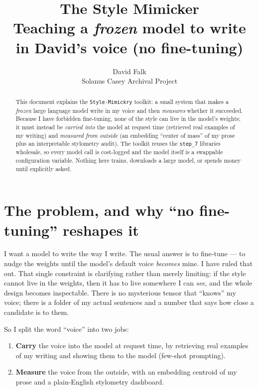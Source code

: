 \documentclass[11pt]{article}
\title{\bfseries The Style Mimicker\\[2pt]
\large Teaching a \emph{frozen} model to write in David's voice (no fine-tuning)}
\author{David Falk \\ Solanus Casey Archival Project}
\date{}
\newcommand{\code}[1]{\texttt{#1}}
\begin{document}
\maketitle

\begin{abstract}
This document explains the \code{Style-Mimickry} toolkit: a small system that makes a
\emph{frozen} large language model write in my voice and then \emph{measures} whether it
succeeded. Because I have forbidden fine-tuning, none of the style can live in the model's
weights; it must instead be \emph{carried into} the model at request time (retrieved real examples
of my writing) and \emph{measured from outside} (an embedding ``center of mass'' of my prose plus
an interpretable stylometry audit). The toolkit reuses the \code{step\_7} libraries wholesale, so
every model call is cost-logged and the model itself is a swappable configuration variable. Nothing
here trains, downloads a large model, or spends money until explicitly asked.
\end{abstract}

\tableofcontents

\section{The problem, and why ``no fine-tuning'' reshapes it}

I want a model to write the way I write. The usual answer is to fine-tune --- to nudge the weights
until the model's default voice \emph{becomes} mine. I have ruled that out. That single constraint
is clarifying rather than merely limiting: if the style cannot live in the weights, then it has to
live somewhere I can \emph{see}, and the whole design becomes inspectable. There is no mysterious
tensor that ``knows'' my voice; there is a folder of my actual sentences and a number that says how
close a candidate is to them.

So I split the word ``voice'' into two jobs:

\begin{enumerate}[leftmargin=*]
  \item \textbf{Carry} the voice into the model at request time, by retrieving real examples of my
        writing and showing them to the model (few-shot prompting).
  \item \textbf{Measure} the voice from the outside, with an embedding centroid of my prose and a
        plain-English stylometry dashboard.
\end{enumerate}
\end{document}
